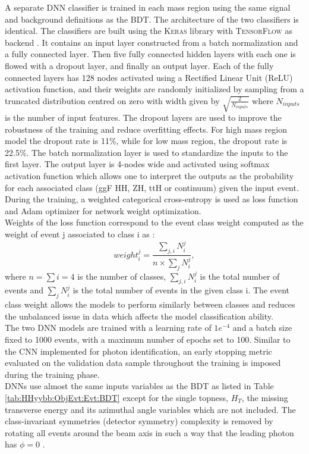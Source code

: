 A separate DNN classifier is trained in each mass region using the same signal and background definitions as the BDT. The architecture of the two classifiers is identical. The classifiers are built using the \textsc{Keras} library with \textsc{TensorFlow} as backend \cite{keras,tensorflow}. It contains an input layer constructed from a batch normalization and a fully connected layer. Then five fully connected hidden layers with each one is flowed with a dropout layer, and finally an output layer. Each of the fully connected layers has 128 nodes activated using a Rectified Linear Unit (ReLU) activation function, and their weights are randomly initialized by sampling from a truncated distribution centred on zero with width given by $\sqrt{\frac{2}{N_{inputs}}}$ where $N_{inputs}$ is the number of input features. The dropout layers are used to improve the robustness of the training and reduce overfitting effects. For high mass region model the dropout rate is 11\%, while for low mass region, the dropout rate is 22.5\%. The batch normalization layer is used to standardize the inputs to the first layer. The output layer is 4-nodes wide and activated using softmax activation function which allows one to interpret the outputs as the probability for each associated class (ggF HH, ZH, ttH or continuum) given the input event. During the training, a weighted categorical cross-entropy is used as loss function and Adam optimizer for network weight optimization.\\
Weights of the loss function correspond to the event class weight computed as the weight of event j associated to class i as :
\begin{equation}
    weight_i^j = \frac{\sum_{j,i} N_i^j}{n\times\sum_{j} N_i^j},
\end{equation}
where $n=\sum i = 4$ is the number of classes, $\sum_{j,i} N_i^j$ is the total number of events and $\sum_{j} N_i^j$ is the total number of events in the given class i. The event class weight allows the models to perform similarly between classes and reduces the unbalanced issue in data which affects the model classification ability.\\
The two DNN models are trained with a learning rate of $1e^{-4}$ and a batch size fixed to 1000 events, with a maximum number of epochs set to 100. Similar to the CNN implemented for photon identification, an early stopping metric evaluated on the validation data sample throughout the training is imposed during the training phase.\\ 
DNNs use almost the same inputs variables as the BDT as listed in Table \ref{tab:HHyybb:ObjEvt:Evt:BDT} except for the single topness, $H_T$, the missing transverse energy and its azimuthal angle variables which are not included. The class-invariant symmetries (detector symmetry) complexity is removed by rotating all events around the beam axis in such a way that the leading photon has $\phi=0$ . \\
